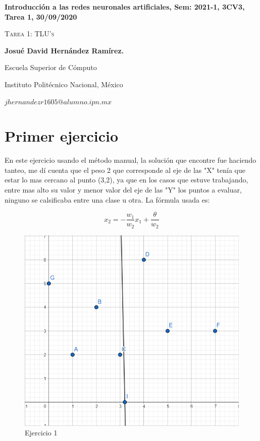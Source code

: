 \documentclass[12pt,twoside]{article}
\date{}
\begin{document}
\centerline{\bf Introducción a las redes neuronales artificiales, Sem: 2021-1, 3CV3, Tarea 1, 30/09/2020}
\centerline{}
\centerline{}
\begin{center}
\Large{\textsc{Tarea 1: TLU's}}
\end{center}
\centerline{}
\centerline{\bf {Josu\'e David Hern\'andez Ram\'irez.}}
\centerline{}
\centerline{Escuela Superior de C\'omputo}
\centerline{Instituto Polit\'ecnico Nacional, M\'exico}
\centerline{$jhernandezr1605@alumno.ipn.mx$}
\newtheorem{Theorem}{\quad Theorem}[section]
\newtheorem{Definition}[Theorem]{\quad Definition}
\newtheorem{Corollary}[Theorem]{\quad Corollary}
\newtheorem{Lemma}[Theorem]{\quad Lemma}
\newtheorem{Example}[Theorem]{\quad Example}
\bigskip
\section{Primer ejercicio}


    En este ejercicio usando el método manual, la solución que encontre fue
haciendo tanteo, me dí cuenta que el peso 2 que corresponde al eje de las
"X" tenía que estar lo mas cercano al punto (3,2), ya que en los casos
que estuve trabajando, entre mas alto su valor y menor valor del eje de las "Y"
los puntos a evaluar, ninguno se calsificaba entre una clase u otra. La fórmula
usada es:

$$x_{2} = - \frac{w_{1}}{w_{2}}x_{1} + \frac{\theta}{w_{2}}$$

    \begin{figure}[h!]
        \centering
        \includegraphics[scale=0.25]{./img/ejercicio1}
        \caption{Ejercicio 1}
        \label{fig:ejer1}
    \end{figure}
\end{document}
